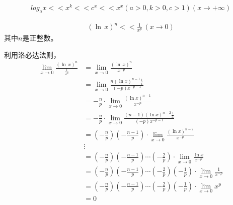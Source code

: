 \documentclass{article}
\begin{document}
\begin{zremark}
  \begin{align*}
    log_a x << x^k << c^x << x^x (a > 0, k > 0, c > 1) (x \to +\infty)
  \end{align*}
\end{zremark}


\begin{zremark}
  \begin{align*}
    (\ln\, x)^n << \frac{1}{x^p} \, (x \to 0)
  \end{align*}
  其中$n$是正整数。
\end{zremark}

利用洛必达法则，
\begin{align*}
  \lim\limits_{x \to 0} \frac{(\ln\, x)^n}{\frac{1}{x^p}}
   & = \lim\limits_{x \to 0} \frac{(\ln\, x)^n}{x^{-p}}                                                                       \\
   & = \lim\limits_{x \to 0} \frac{n (\ln x)^{n - 1} \frac{1}{x}}{(-p) x^{-p - 1}}                                            \\
   & = - \frac{n}{p} \cdot \lim\limits_{x \to 0} \frac{(\ln x)^{n - 1}}{x^{-p}}                                               \\
   & = - \frac{n}{p} \cdot \lim\limits_{x \to 0} \frac{(n - 1)(\ln x)^{n - 2}\frac{1}{x}}{(-p) x^{-p - 1}}                    \\
   & = (- \frac{n}{p})(- \frac{n - 1}{p}) \cdot \lim\limits_{x \to 0} \frac{(\ln x)^{n - 2}}{x^{-p}}                          \\
   & \vdots                                                                                                                   \\
   & = (- \frac{n}{p})(- \frac{n - 1}{p}) \cdots (- \frac{2}{p}) \cdot \lim\limits_{x \to 0} \frac{\ln x}{x^{-p}}             \\
   & = (- \frac{n}{p})(- \frac{n - 1}{p}) \cdots (- \frac{2}{p}) (- \frac{1}{p}) \cdot \lim\limits_{x \to 0} \frac{1}{x^{-p}} \\
   & = (- \frac{n}{p})(- \frac{n - 1}{p}) \cdots (- \frac{2}{p}) (- \frac{1}{p}) \cdot \lim\limits_{x \to 0} x^p              \\
   & = 0
\end{align*}
\end{document}
